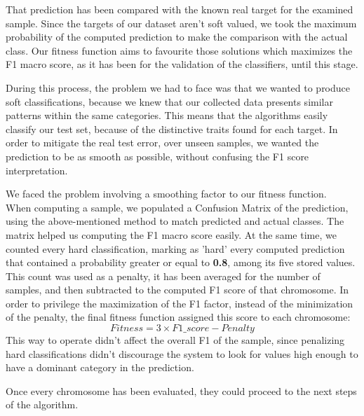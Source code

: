\begin{itemize}
	That prediction has been compared with the known real target for the examined sample.
	Since the targets of our dataset aren't soft valued, we took the maximum probability of the computed prediction to make the comparison with the actual class.
	Our fitness function aims to favourite those solutions which maximizes the F1 macro score, as it has been for the validation of the classifiers, until this stage.
	
	During this process, the problem we had to face was that we wanted to produce soft classifications, because we knew that our collected data presents similar patterns within the same categories. This means that the algorithms easily classify our test set, because of the distinctive traits found for each target. In order to mitigate the real test error, over unseen samples, we wanted the prediction to be as smooth as possible, without confusing the F1 score interpretation.
	
	We faced the problem involving a smoothing factor to our fitness function.\\
	When computing a sample, we populated a Confusion Matrix of the prediction, using the above-mentioned method to match predicted and actual classes. The matrix helped us computing the F1 macro score easily. At the same time, we counted every hard classification, marking as 'hard' every computed prediction that contained a probability greater or equal to \textbf{0.8}, among its five stored values.
	This count was used as a penalty, it has been averaged for the number of samples, and then subtracted to the computed F1 score of that chromosome. In order to privilege the maximization of the F1 factor, instead of the minimization of the penalty, the final fitness function assigned this score to each chromosome:
	\[ Fitness = 3 \times F1\_score - Penalty \]
	This way to operate didn't affect the overall F1 of the sample, since penalizing hard classifications didn't discourage the system to look for values high enough to have a dominant category in the prediction.
	
	Once every chromosome has been evaluated, they could proceed to the next steps of the algorithm.
	

\end{itemize}
